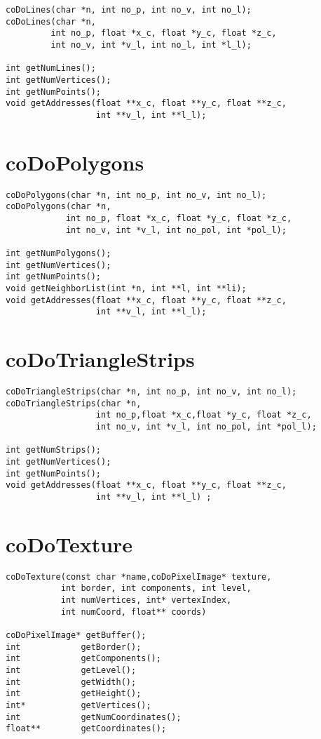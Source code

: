 \begin{verbatim}
coDoLines(char *n, int no_p, int no_v, int no_l);
coDoLines(char *n, 
         int no_p, float *x_c, float *y_c, float *z_c, 
         int no_v, int *v_l, int no_l, int *l_l);
 
int getNumLines();
int getNumVertices();
int getNumPoints();
void getAddresses(float **x_c, float **y_c, float **z_c, 
                  int **v_l, int **l_l);
\end{verbatim}


\section{coDoPolygons}

\begin{verbatim}
coDoPolygons(char *n, int no_p, int no_v, int no_l);
coDoPolygons(char *n, 
            int no_p, float *x_c, float *y_c, float *z_c, 
            int no_v, int *v_l, int no_pol, int *pol_l);
 
int getNumPolygons();
int getNumVertices();
int getNumPoints();
void getNeighborList(int *n, int **l, int **li);      
void getAddresses(float **x_c, float **y_c, float **z_c, 
                  int **v_l, int **l_l);
\end{verbatim}


\section{coDoTriangleStrips}

\begin{verbatim}
coDoTriangleStrips(char *n, int no_p, int no_v, int no_l);
coDoTriangleStrips(char *n, 
                  int no_p,float *x_c,float *y_c, float *z_c, 
                  int no_v, int *v_l, int no_pol, int *pol_l);
 
int getNumStrips();
int getNumVertices();
int getNumPoints();
void getAddresses(float **x_c, float **y_c, float **z_c, 
                  int **v_l, int **l_l) ;
\end{verbatim}


\section{coDoTexture}
 
\begin{verbatim}
coDoTexture(const char *name,coDoPixelImage* texture,
           int border, int components, int level,
           int numVertices, int* vertexIndex,
           int numCoord, float** coords)
  
coDoPixelImage* getBuffer();
int            getBorder();
int            getComponents();
int            getLevel();
int            getWidth();
int            getHeight();
int*           getVertices();
int            getNumCoordinates();
float**        getCoordinates();
\end{verbatim}


